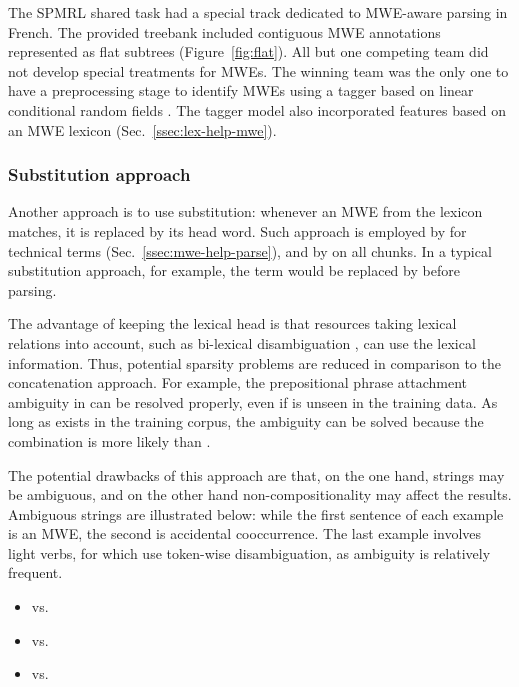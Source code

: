 \documentclass[output=paper]{LSP/langsci}
\begin{document}
The SPMRL shared task \citep{seddah13} had a special track dedicated to MWE-aware parsing in French. The provided treebank included contiguous MWE annotations represented as flat subtrees (Figure~\ref{fig:flat}). All but one competing team did not develop special treatments for MWEs. The winning team was the only one to have a preprocessing stage to identify MWEs using a tagger based on linear conditional random fields \citep{constant:13:MWE}. The tagger model also incorporated features based on an MWE lexicon (Sec.~\ref{ssec:lex-help-mwe}).

\subsubsection{Substitution approach}
\label{ssec:subst}


Another approach is to use substitution: whenever an MWE from the lexicon 
matches, it is replaced by its head word. Such approach is employed by \citep{weeds-ea07} for technical terms (Sec.~\ref{ssec:mwe-help-parse}), and by \citet{schneiderphd} on all chunks.
In a typical substitution approach, for example, the term  would be replaced by  before parsing. 

The advantage of keeping the lexical head is that resources taking lexical relations into account, such as bi-lexical disambiguation \citep{collins99}, can use the lexical information. Thus, potential sparsity problems are reduced in comparison to the concatenation approach. For example, the prepositional phrase attachment ambiguity in 
can be resolved properly, even if  is unseen in the training data. As long as  exists in the training corpus, the ambiguity can be solved because the combination  is more likely than . 

The potential drawbacks of this approach are that, on the one hand, strings may be ambiguous, and on the other hand non-compositionality may affect the results. 
Ambiguous strings are illustrated below: while the first sentence of each example is an MWE, the second is accidental cooccurrence. The last example involves light verbs, for which \citet{tu-roth:2011:mwe} use token-wise disambiguation, as ambiguity is relatively frequent. 

\begin{itemize}
\item {}
%
vs. \\
\item {}
%
vs. \\
\item {}
%
vs. \\
\end{itemize}
\end{document}
